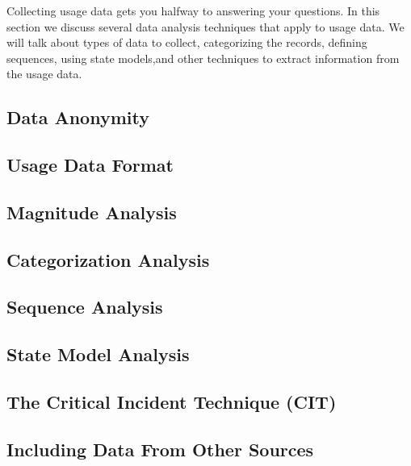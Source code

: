 Collecting usage data gets you halfway to answering your questions.  In this section we discuss several data analysis techniques that apply to usage data.  We will talk about types of data to collect, categorizing the records, defining sequences, using state models,and other techniques to extract information from the usage data.
\label{sec:dataAnonymity}
\subsection{Data Anonymity}


\subsection{Usage Data Format}


\subsection{Magnitude Analysis}


\subsection{Categorization Analysis}


\subsection{Sequence Analysis}


\subsection{State Model Analysis}


\subsection{The Critical Incident Technique (CIT)}


\label{sec:IncludingOtherSources}
\subsection{Including Data From Other Sources}


